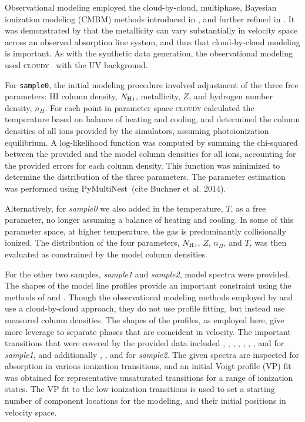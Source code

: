 \documentclass[fleqn,usenatbib]{mnras}
\begin{document}
Observational modeling employed the cloud-by-cloud, multiphase, Bayesian ionization modeling (CMBM) methods introduced in \cite{Sameer2021}, and further refined in \cite{Sameer2022}. It was demonstrated by \cite{Zahedy2019} that the metallicity can vary substantially in velocity space across an observed absorption line system, and thus that cloud-by-cloud modeling is important. As with the synthetic data generation, the observational modeling used \textsc{cloudy}~\citep{Ferland2013} with the \cite{Haardt2012} UV background.

For \texttt{sample0}, the initial modeling procedure involved adjustment of the three free parameters: HI column density, $N_{\ion{H}{I}}$, metallicity, $Z$, and hydrogen number density, $n_H$. For each point in parameter space \textsc{cloudy} calculated the temperature based on balance of heating and cooling, and determined the column densities of all ions provided by the simulators, assuming photoionization equilibrium. A log-likelihood function was computed by summing the chi-squared between the provided and the model column densities for all ions, accounting for the provided errors for each column density.  This function was minimized to determine the distribution of the three parameters. The parameter estimation was performed using PyMultiNest~(cite Buchner et al. 2014). 

Alternatively, for \textit{sample0} we also added in the temperature, $T$, as a free parameter, no longer assuming a balance of heating and cooling.  In some of this parameter space, at higher temperature, the gas is predominantly collisionally ionized.  The distribution of the four parameters, $N_{\ion{H}{I}}$, $Z$, $n_H$, and $T$, was then evaluated as constrained by the model column densities.

For the other two samples, \textit{sample1} and \textit{sample2}, model spectra were provided. The shapes of the model line profiles provide an important constraint using the methods of \cite{Sameer2021} and \cite{Sameer2022}. Though the observational modeling methods employed by \cite{Zahedy2019} and \cite{Haislmaier2021} use a cloud-by-cloud approach, they do not use profile fitting, but instead use measured column densities. The shapes of the profiles, as employed here, give more leverage to separate phases that are coincident in velocity. The important transitions that were covered by the provided  data included , , , , , , , and  for \textit{sample1}, and additionally , , and  for \textit{sample2}. The given spectra are inspected for absorption in various ionization transitions, and an initial Voigt profile (VP) fit was obtained for representative unsaturated transitions for a range of ionization states.  The VP fit to the low ionization transitions is used to set a starting number of component locations for the modeling, and their initial positions in velocity space.
\end{document}
